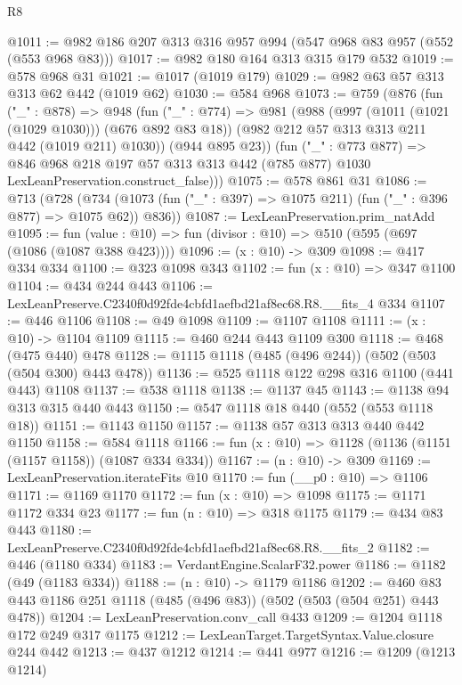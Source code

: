 \begin{lexlean}{R8}
\begin{coremodule}
@1011 := @982 @186 @207 @313 @316 @957 @994 (@547 @968 @83 @957 (@552 (@553 @968 @83)))
@1017 := @982 @180 @164 @313 @315 @179 @532
@1019 := @578 @968 @31
@1021 := @1017 (@1019 @179)
@1029 := @982 @63 @57 @313 @313 @62 @442 (@1019 @62)
@1030 := @584 @968
@1073 := @759
    (@876
      (fun ("_" : @878) =>
      @948
        (fun ("_" : @774) =>
        @981
          (@988
            (@997 (@1011 (@1021 (@1029 @1030))) (@676 @892 @83 @18))
            (@982 @212 @57 @313 @313 @211 @442 (@1019 @211) @1030))
          (@944 @895 @23))
        (fun ("_" : @773 @877) =>
        @846
          @968
          @218
          @197
          @57
          @313
          @313
          @442
          (@785 @877)
          @1030
          LexLeanPreservation.construct_false)))
@1075 := @578 @861 @31
@1086 := @713
    (@728 (@734 (@1073 (fun ("_" : @397) => @1075 @211) (fun ("_" : @396 @877) => @1075 @62)) @836))
@1087 := LexLeanPreservation.prim_natAdd
@1095 := fun (value : @10) => fun (divisor : @10) => @510 (@595 (@697 (@1086 (@1087 @388 @423))))
@1096 := (x : @10) -> @309
@1098 := @417 @334 @334
@1100 := @323 @1098 @343
@1102 := fun (x : @10) => @347 @1100
@1104 := @434 @244 @443
@1106 := LexLeanPreserve.C2340f0d92fde4cbfd1aefbd21af8ec68.R8.__fits_4 @334
@1107 := @446 @1106
@1108 := @49 @1098
@1109 := @1107 @1108
@1111 := (x : @10) -> @1104 @1109
@1115 := @460 @244 @443 @1109 @300
@1118 := @468 (@475 @440) @478
@1128 := @1115 @1118 (@485 (@496 @244)) (@502 (@503 (@504 @300) @443 @478))
@1136 := @525 @1118 @122 @298 @316 @1100 (@441 @443) @1108
@1137 := @538 @1118
@1138 := @1137 @45
@1143 := @1138 @94 @313 @315 @440 @443
@1150 := @547 @1118 @18 @440 (@552 (@553 @1118 @18))
@1151 := @1143 @1150
@1157 := @1138 @57 @313 @313 @440 @442 @1150
@1158 := @584 @1118
@1166 := fun (x : @10) => @1128 (@1136 (@1151 (@1157 @1158)) (@1087 @334 @334))
@1167 := (n : @10) -> @309
@1169 := LexLeanPreservation.iterateFits @10
@1170 := fun (__p0 : @10) => @1106
@1171 := @1169 @1170
@1172 := fun (x : @10) => @1098
@1175 := @1171 @1172 @334 @23
@1177 := fun (n : @10) => @318 @1175
@1179 := @434 @83 @443
@1180 := LexLeanPreserve.C2340f0d92fde4cbfd1aefbd21af8ec68.R8.__fits_2
@1182 := @446 (@1180 @334)
@1183 := VerdantEngine.ScalarF32.power
@1186 := @1182 (@49 (@1183 @334))
@1188 := (n : @10) -> @1179 @1186
@1202 := @460 @83 @443 @1186 @251 @1118 (@485 (@496 @83)) (@502 (@503 (@504 @251) @443 @478))
@1204 := LexLeanPreservation.conv_call @433
@1209 := @1204 @1118 @172 @249 @317 @1175
@1212 := LexLeanTarget.TargetSyntax.Value.closure @244 @442
@1213 := @437 @1212
@1214 := @441 @977
@1216 := @1209 (@1213 @1214)

\end{coremodule}
\end{lexlean}
